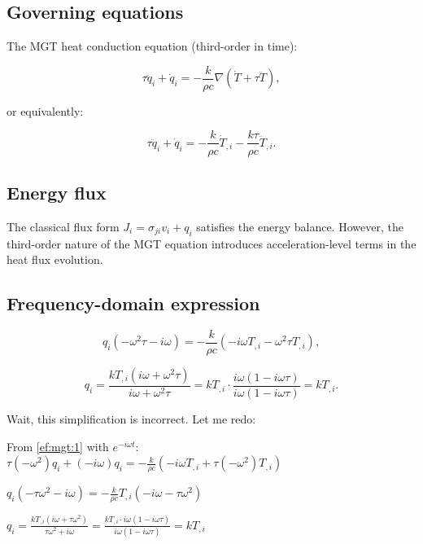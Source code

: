 \documentclass{article}
\begin{document}
\subsection{Governing equations}

The MGT heat conduction equation (third-order in time):

\begin{equation}
\tau\ddot{q}_i + \dot{q}_i = -\frac{k}{\rho c}\nabla(\dot{T} + \tau\ddot{T}),
\label{ef:mgt:1}
\end{equation}

or equivalently:

\begin{equation}
\tau\ddot{q}_i + \dot{q}_i = -\frac{k}{\rho c}\dot{T}_{,i} - \frac{k\tau}{\rho c}\ddot{T}_{,i}.
\label{ef:mgt:2}
\end{equation}

\subsection{Energy flux}

The classical flux form $J_i = \sigma_{ji}v_i + q_i$ satisfies the energy balance. However, the third-order nature of the MGT equation introduces acceleration-level terms in the heat flux evolution.

\subsection{Frequency-domain expression}

\begin{equation}
q_i(-\omega^2\tau - i\omega) = -\frac{k}{\rho c}(-i\omega T_{,i} - \omega^2\tau T_{,i}),
\label{ef:mgt:3}
\end{equation}

\begin{equation}
q_i = \frac{k T_{,i}(i\omega + \omega^2\tau)}{i\omega + \omega^2\tau} = k T_{,i} \cdot \frac{i\omega(1 - i\omega\tau)}{i\omega(1 - i\omega\tau)} = k T_{,i}.
\label{ef:mgt:4}
\end{equation}

Wait, this simplification is incorrect. Let me redo:

From \eqref{ef:mgt:1} with $e^{-i\omega t}$:
$\tau(-\omega^2)q_i + (-i\omega)q_i = -\frac{k}{\rho c}(-i\omega T_{,i} + \tau(-\omega^2)T_{,i})$

$q_i(-\tau\omega^2 - i\omega) = -\frac{k}{\rho c}T_{,i}(-i\omega - \tau\omega^2)$

$q_i = \frac{k T_{,i}(i\omega + \tau\omega^2)}{\tau\omega^2 + i\omega} = \frac{k T_{,i} \cdot i\omega(1 - i\omega\tau)}{i\omega(1 - i\omega\tau)} = k T_{,i}$
\end{document}
